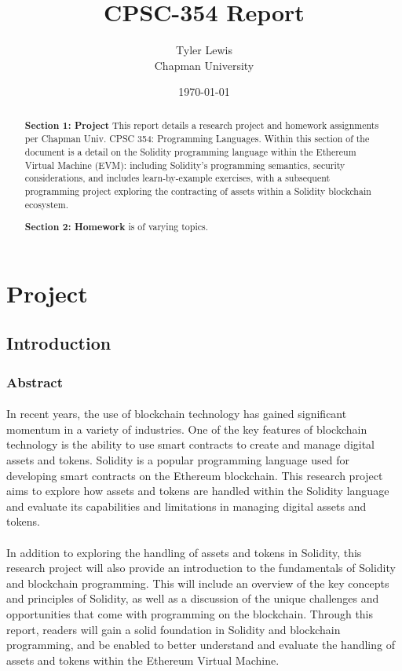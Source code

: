 \documentclass{article}
\title{CPSC-354 Report}
\author{Tyler Lewis  \\ Chapman University}
\date{\today}
\theoremstyle{theorem}
\theoremstyle{definition}
\theoremstyle{remark}
\begin{document}
\setlength\parindent{24pt}

\maketitle

\begin{abstract}

\textbf{Section 1: Project} This report details a research project and homework assignments per Chapman Univ. CPSC 354: Programming Languages. Within this section of the document is a detail on the Solidity programming language within the Ethereum Virtual Machine (EVM): including Solidity's programming semantics, security considerations, and includes learn-by-example exercises, with a subsequent programming project exploring the contracting of assets within a Solidity blockchain ecosystem. 

\textbf{Section 2: Homework} is of varying topics.
\end{abstract}

\tableofcontents

\section{Project}

\subsection{Introduction}
\subsubsection{Abstract}

\paragraph{} In recent years, the use of blockchain technology has gained significant momentum in a variety of industries. One of the key features of blockchain technology is the ability to use smart contracts to create and manage digital assets and tokens. Solidity is a popular programming language used for developing smart contracts on the Ethereum blockchain. This research project aims to explore how assets and tokens are handled within the Solidity language and evaluate its capabilities and limitations in managing digital assets and tokens.

\paragraph{} In addition to exploring the handling of assets and tokens in Solidity, this research project will also provide an introduction to the fundamentals of  Solidity and blockchain programming. This will include an overview of the key concepts and principles of Solidity, as well as a discussion of the unique challenges and opportunities that come with programming on the blockchain. Through this report, readers will gain a solid foundation in Solidity and blockchain programming, and be enabled to better understand and evaluate the handling of assets and tokens within the Ethereum Virtual Machine.
\end{document}
